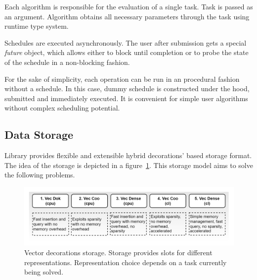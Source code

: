 Each algorithm is responsible for the evaluation of a single task. Task is passed as an argument. Algorithm obtains all necessary parameters through the task using runtime type system.

Schedules are executed asynchronously. The user after submission gets a special \textit{future} object, which allows either to block until completion or to probe the state of the schedule in a non-blocking fashion.

For the sake of simplicity, each operation can be run in an procedural fashion without a schedule. In this case, dummy schedule is constructed under the hood, submitted and immediately executed. It is convenient for simple user algorithms without complex scheduling potential.

\subsection{Data Storage}

Library provides flexible and extensible hybrid decorations' based storage format. The idea of the storage is depicted in a figure~\ref{fig:vec_storage}. This storage model aims to solve the following problems.

\begin{figure}
    \centering
    \includegraphics[width=1.0\textwidth]{images/spla_vector_storage.png}
    \caption{Vector decorations storage. Storage provides slots for different representations. Representation choice depends on a task currently being solved.}
    \label{fig:vec_storage}
\end{figure}

